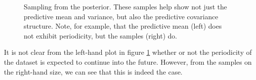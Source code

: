 \documentclass{article} %
\begin{document}


%
\begin{figure}[ht]
\centering
{}
\caption{Sampling from the posterior.  These samples help show not just the predictive mean and variance, but also the predictive covariance structure.  Note, for example, that the predictive mean (left) does not exhibit periodicity, but the samples (right) do.}
\label{fig:extrap-full}
\end{figure}
%
It is not clear from the left-hand plot in figure \ref{fig:extrap-full} whether or not the periodicity of the dataset is expected to continue into the future.  However, from the samples on the right-hand size, we can see that this is indeed the case.  


\end{document}
